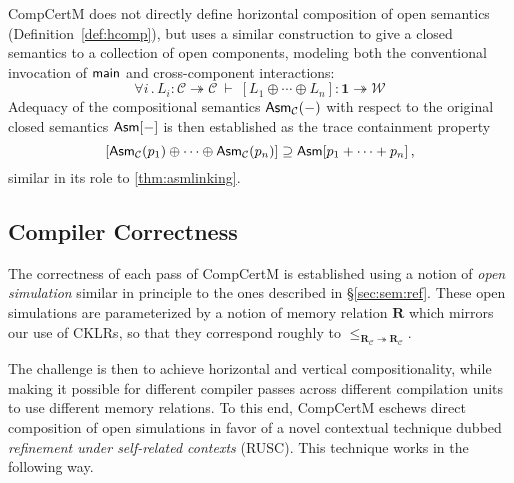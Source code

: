 \documentclass[sigplan,screen]{acmart}
\newenvironment{optional}{}{}
\begin{document}
\begin{optional}
CompCertM does not directly define horizontal composition
of open semantics (Definition~\ref{def:hcomp}),
but uses a similar construction
to give a closed semantics to a collection of open components,
modeling both the conventional invocation of $ \mathsf{main} $
and cross-component interactions:
\[
  \forall i \,.\,
  L_i : \mathcal{C} \twoheadrightarrow \mathcal{C} \: \vdash \:
  [L_1 \oplus \cdots \oplus L_n] : \mathbf{1} \twoheadrightarrow \mathcal{W}
\]
Adequacy of the compositional semantics $ \mathsf{Asm} _\mathcal{C}(-)$
with respect to the original closed semantics $ \mathsf{Asm} [-]$
is then established as the trace containment property
\begin{equation} \label{eqn:asmadeq}
  [ \mathsf{Asm} _\mathcal{C}(p_1) \oplus \cdots \oplus  \mathsf{Asm} _\mathcal{C}(p_n)] \supseteq
   \mathsf{Asm} [p_1 + \cdots + p_n]
  \,,
\end{equation}
similar in its role to \autoref{thm:asmlinking}.


\subsection{Compiler Correctness} %

The correctness of each pass of CompCertM
is established using a notion of \emph{open simulation}
similar in principle to the ones described in \S\ref{sec:sem:ref}.
These open simulations
are parameterized by a notion of memory relation $\mathbf{R}$
which mirrors our use of CKLRs,
so that they correspond roughly to
$\le_{\mathbf{R}_\mathcal{C} \twoheadrightarrow \mathbf{R}_\mathcal{C}}$.

The challenge is then to achieve
horizontal and vertical compositionality,
while making it possible
for different compiler passes
across different compilation units
to use different memory relations.
To this end,
CompCertM eschews direct composition of open simulations
in favor of a novel contextual technique dubbed
\emph{refinement under self-related contexts} (RUSC).
This technique works in the following way.


\end{optional}
\end{document}
